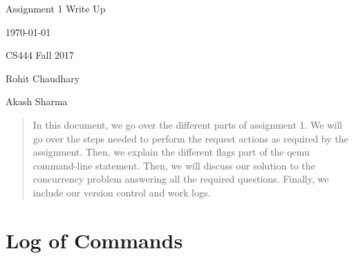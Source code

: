 \documentclass[onecolumn, draftclsnofoot,10pt, compsoc]{IEEEtran}
\newcommand{\NameSigPair}[1]{\par
\makebox[2.75in][r]{#1} \hfil 	\makebox[3.25in]{\makebox[2.25in]{\hrulefill} \hfill		\makebox[.75in]{\hrulefill}}
\par\vspace{-12pt} \textit{\tiny\noindent
\makebox[2.75in]{} \hfil		\makebox[3.25in]{\makebox[2.25in][r]{Signature} \hfill	\makebox[.75in][r]{Date}}}}
\renewcommand{\NameSigPair}[1]{#1}
\begin{document}
\begin{titlepage}
    \begin{singlespace}
        \hfill
        \par\vspace{.2in}
        \centering
        \scshape{
            \huge Assignment 1 Write Up \par
            {\large\today}\par
			{\large CS444 Fall 2017}\par
            \vspace{.6in}
            {\Large
                \NameSigPair{Rohit Chaudhary}\par
                \NameSigPair{Akash Sharma}\par
            }
            \vfill
        }
        \begin{abstract}
        	In this document, we go over the different parts of assignment 1.
					We will go over the steps needed to perform the request actions as
					required by the assignment. Then, we explain the different flags part
					of the qemu command-line statement. Then, we will discuss our
					solution to the concurrency problem answering all the required
					questions. Finally, we include our version control and work logs.
        \end{abstract}
    \end{singlespace}
\end{titlepage}
\newpage
{}
\tableofcontents
\clearpage

\section{Log of Commands}
\end{document}
